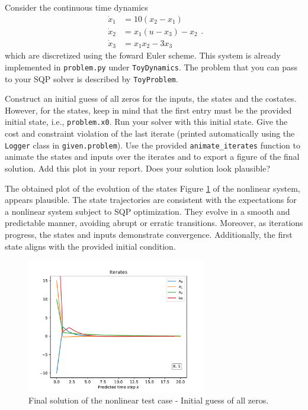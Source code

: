 \documentclass[]{article}
\begin{document}
Consider the continuous time dynamics 
\[
\begin{aligned}
  \dot{x}_1 &=  10(x_2 - x_1) \\
  \dot{x}_2 &= x_1(u - x_3) - x_2 \\
  \dot{x}_3 &= x_1x_2 - 3x_3 
\end{aligned}
.\] 
which are discretized using the foward Euler scheme. 
This system is already implemented in \texttt{problem.py} under \texttt{ToyDynamics}. 
The problem that you can pass to your SQP solver is described by \texttt{ToyProblem}.

\begin{assignment} \label{assgn:62}
	Construct an initial guess of all zeros for the inputs, the states and the costates.
	However, for the states, keep in mind that the first entry must be the provided initial 
	state, i.e., \texttt{problem.x0}. Run your solver with this 
	initial state. Give the cost and constraint violation of the last iterate
	(printed automatically using the \texttt{Logger} class in \texttt{given.problem}). 
	Use the provided \texttt{animate\_iterates} function to animate the states and inputs over the iterates and to export a 
	figure of the final solution. Add this plot in your report. Does your solution look plausible?
\end{assignment}
\begin{flushleft}
	The obtained plot of the evolution of the states Figure \ref{fig:assignment6_2} of the nonlinear system, appears plausible. 
	The state trajectories are consistent with the expectations for a nonlinear system subject to SQP optimization. They evolve in a smooth and predictable manner, avoiding abrupt or erratic transitions.
	Moreover, as iterations progress, the states and inputs demonstrate convergence. Additionally, the first state aligns with the provided initial condition.
\end{flushleft}
\begin{figure}[H]
	\centering
	\includegraphics[width=0.7\textwidth]{images/Assignment6-2.pdf}
	\caption{Final solution of the nonlinear test case - Initial guess of all zeros.}
	\label{fig:assignment6_2}
\end{figure}
\end{document}
